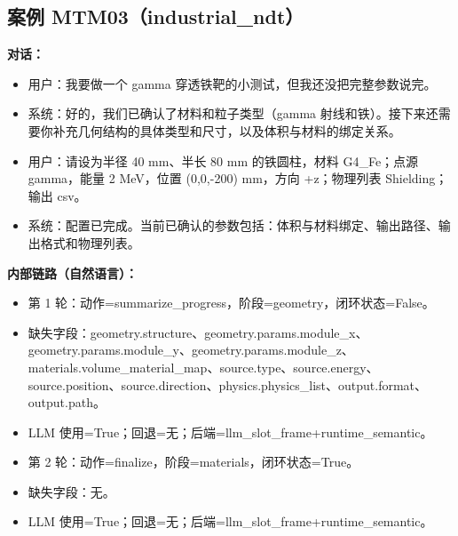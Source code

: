 \documentclass[11pt]{ctexart}
\begin{document}
\subsection{案例 MTM03（industrial\_ndt）}
\textbf{对话：}
\begin{itemize}
\item 用户：我要做一个 gamma 穿透铁靶的小测试，但我还没把完整参数说完。
\item 系统：好的，我们已确认了材料和粒子类型（gamma 射线和铁）。接下来还需要你补充几何结构的具体类型和尺寸，以及体积与材料的绑定关系。
\item 用户：请设为半径 40 mm、半长 80 mm 的铁圆柱，材料 G4\_Fe；点源 gamma，能量 2 MeV，位置 (0,0,-200) mm，方向 +z；物理列表 Shielding；输出 csv。
\item 系统：配置已完成。当前已确认的参数包括：体积与材料绑定、输出路径、输出格式和物理列表。
\end{itemize}
\textbf{内部链路（自然语言）：}
\begin{itemize}
\item 第 1 轮：动作=summarize\_progress，阶段=geometry，闭环状态=False。
\item 缺失字段：geometry.structure、geometry.params.module\_x、geometry.params.module\_y、geometry.params.module\_z、materials.volume\_material\_map、source.type、source.energy、source.position、source.direction、physics.physics\_list、output.format、output.path。
\item LLM 使用=True；回退=无；后端=llm\_slot\_frame+runtime\_semantic。
\item 第 2 轮：动作=finalize，阶段=materials，闭环状态=True。
\item 缺失字段：无。
\item LLM 使用=True；回退=无；后端=llm\_slot\_frame+runtime\_semantic。
\end{itemize}
\end{document}
